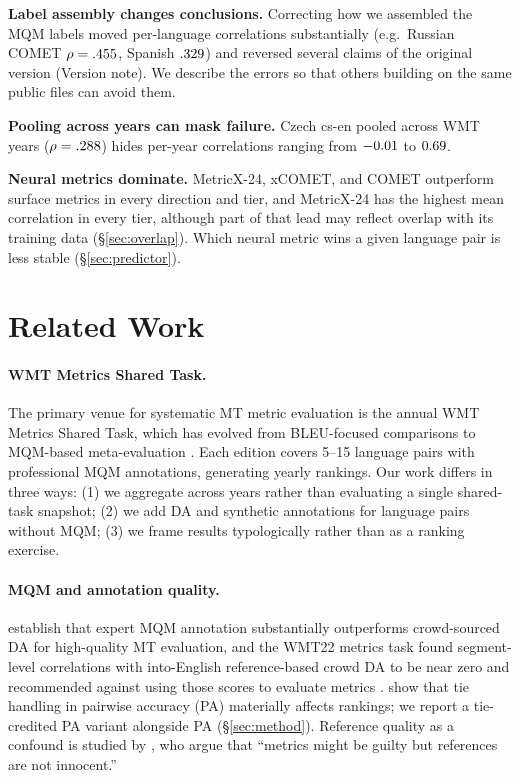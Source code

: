 \documentclass[11pt]{article}
\begin{document}
\textbf{Label assembly changes conclusions.} Correcting how we assembled the MQM labels moved per-language correlations substantially (e.g.\ Russian COMET $\rho=.455$, Spanish $.329$) and reversed several claims of the original version (Version note). We describe the errors so that others building on the same public files can avoid them.

\textbf{Pooling across years can mask failure.} Czech cs-en pooled across WMT years ($\rho=.288$) hides per-year correlations ranging from $-0.01$ to $0.69$.

\textbf{Neural metrics dominate.} MetricX-24, xCOMET, and COMET outperform surface metrics in every direction and tier, and MetricX-24 has the highest mean correlation in every tier, although part of that lead may reflect overlap with its training data (\S\ref{sec:overlap}). Which neural metric wins a given language pair is less stable (\S\ref{sec:predictor}).

\section{Related Work}
\label{sec:related}

\paragraph{WMT Metrics Shared Task.}
The primary venue for systematic MT metric evaluation is the annual WMT Metrics Shared Task, which has evolved from BLEU-focused comparisons \cite{bojar2017wmt} to MQM-based meta-evaluation \cite{freitag2023results}. Each edition covers 5--15 language pairs with professional MQM annotations, generating yearly rankings. Our work differs in three ways: (1) we aggregate across years rather than evaluating a single shared-task snapshot; (2) we add DA and synthetic annotations for language pairs without MQM; (3) we frame results typologically rather than as a ranking exercise.

\paragraph{MQM and annotation quality.}
\citet{freitag2021experts} establish that expert MQM annotation substantially outperforms crowd-sourced DA for high-quality MT evaluation, and the WMT22 metrics task found segment-level correlations with into-English reference-based crowd DA to be near zero and recommended against using those scores to evaluate metrics \citep[App.~B]{freitag2022results}. \citet{deutsch2023ties} show that tie handling in pairwise accuracy (PA) materially affects rankings; we report a tie-credited PA variant alongside PA (\S\ref{sec:method}). Reference quality as a confound is studied by \citet{freitag2023results}, who argue that ``metrics might be guilty but references are not innocent.''
\end{document}
